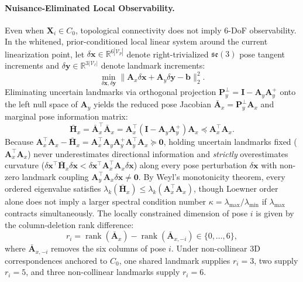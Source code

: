 \documentclass{evidencescene}
\begin{document}
\paragraph{Nuisance-Eliminated Local Observability.} Even when $\mathbf{X}_i\in C_0$, topological connectivity does not imply 6-DoF observability. In the whitened, prior-conditioned local linear system around the current linearization point, let $\delta\mathbf{x}\in\mathbb{R}^{6|\mathcal{V}_p|}$ denote right-trivialized $\mathfrak{se}(3)$ pose tangent increments and $\delta\mathbf{y}\in\mathbb{R}^{3|\mathcal{V}_\ell|}$ denote landmark increments:
\begin{equation}
    \min_{\delta\mathbf{x},\delta\mathbf{y}}\|\mathbf{A}_x\delta\mathbf{x}+\mathbf{A}_y\delta\mathbf{y}-\mathbf{b}\|_2^2.
    \label{eq:joint_ls}
\end{equation}
Eliminating uncertain landmarks via orthogonal projection $\mathbf{P}_y^\perp=\mathbf{I}-\mathbf{A}_y\mathbf{A}_y^+$ onto the left null space of $\mathbf{A}_y$ yields the reduced pose Jacobian $\bar{\mathbf{A}}_x=\mathbf{P}_y^\perp\mathbf{A}_x$ and marginal pose information matrix:
\begin{equation}
    \bar{\mathbf{H}}_x=\bar{\mathbf{A}}_x^\top\bar{\mathbf{A}}_x=\mathbf{A}_x^\top(\mathbf{I}-\mathbf{A}_y\mathbf{A}_y^+)\mathbf{A}_x\preceq\mathbf{A}_x^\top\mathbf{A}_x.
    \label{eq:schur_info}
\end{equation}
Because $\mathbf{A}_x^\top\mathbf{A}_x-\bar{\mathbf{H}}_x=\mathbf{A}_x^\top\mathbf{A}_y\mathbf{A}_y^+\mathbf{A}_y^\top\mathbf{A}_x\succeq\mathbf{0}$, holding uncertain landmarks fixed ($\mathbf{A}_x^\top\mathbf{A}_x$) never underestimates directional information and \emph{strictly} overestimates curvature ($\delta\mathbf{x}^\top\bar{\mathbf{H}}_x\delta\mathbf{x}<\delta\mathbf{x}^\top\mathbf{A}_x^\top\mathbf{A}_x\delta\mathbf{x}$) along every pose perturbation $\delta\mathbf{x}$ with non-zero landmark coupling $\mathbf{A}_y^\top\mathbf{A}_x\delta\mathbf{x}\neq\mathbf{0}$. By Weyl's monotonicity theorem, every ordered eigenvalue satisfies $\lambda_k(\bar{\mathbf{H}}_x)\le\lambda_k(\mathbf{A}_x^\top\mathbf{A}_x)$, though Loewner order alone does not imply a larger spectral condition number $\kappa=\lambda_{\max}/\lambda_{\min}$ if $\lambda_{\max}$ contracts simultaneously. The locally constrained dimension of pose $i$ is given by the column-deletion rank difference:
\begin{equation}
    r_i=\operatorname{rank}(\bar{\mathbf{A}}_x)-\operatorname{rank}(\bar{\mathbf{A}}_{x,-i})\in\{0,\dots,6\},
    \label{eq:rank_diff}
\end{equation}
where $\bar{\mathbf{A}}_{x,-i}$ removes the six columns of pose $i$. Under non-collinear 3D correspondences anchored to $C_0$, one shared landmark supplies $r_i=3$, two supply $r_i=5$, and three non-collinear landmarks supply $r_i=6$.
\end{document}
